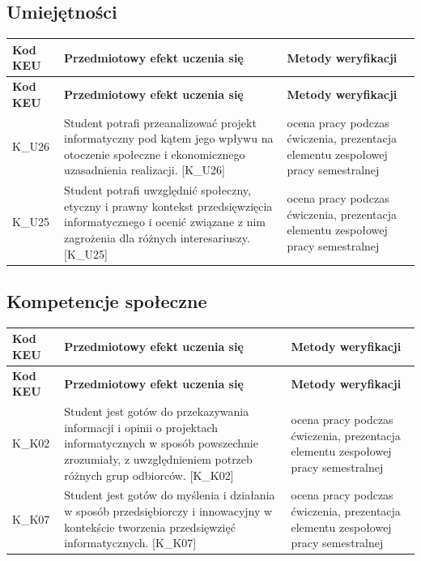 \documentclass[12pt, a4paper]{article}
\newcommand{\thdrule}{\noalign{\global\setlength{\extrarowheight}{0pt}}}
\newcommand{\thdend}{\noalign{\global\setlength{\extrarowheight}{3pt}}}
\begin{document}
\subsection*{Umiejętności}
{\scriptsize
\begin{longtable}{m{1.6cm}m{9.0cm}m{4.2cm}}
\thdrule\toprule
\rowcolor{pjatkRed} {\color{white}\footnotesize\textbf{\vphantom{Ag}Kod KEU}} & {\color{white}\footnotesize\textbf{\vphantom{Ag}Przedmiotowy efekt uczenia się}} & {\color{white}\footnotesize\textbf{\vphantom{Ag}Metody weryfikacji}} \\
\midrule\thdend
\endfirsthead
\thdrule\toprule
\rowcolor{pjatkRed} {\color{white}\footnotesize\textbf{\vphantom{Ag}Kod KEU}} & {\color{white}\footnotesize\textbf{\vphantom{Ag}Przedmiotowy efekt uczenia się}} & {\color{white}\footnotesize\textbf{\vphantom{Ag}Metody weryfikacji}} \\
\midrule\thdend
\endhead
  \rowcolor{tableRowLight} K\_U26 & Student potrafi przeanalizować projekt informatyczny pod kątem jego wpływu na otoczenie społeczne i ekonomicznego uzasadnienia realizacji. {[}K\_U26{]} & ocena pracy podczas ćwiczenia, prezentacja elementu zespołowej pracy semestralnej \\
  \rowcolor{tableRowAlt} K\_U25 & Student potrafi uwzględnić społeczny, etyczny i prawny kontekst przedsięwzięcia informatycznego i ocenić związane z nim zagrożenia dla różnych interesariuszy. {[}K\_U25{]} & ocena pracy podczas ćwiczenia, prezentacja elementu zespołowej pracy semestralnej \\
\bottomrule
\end{longtable}}

\subsection*{Kompetencje społeczne}
{\scriptsize
\begin{longtable}{m{1.6cm}m{9.0cm}m{4.2cm}}
\thdrule\toprule
\rowcolor{pjatkRed} {\color{white}\footnotesize\textbf{\vphantom{Ag}Kod KEU}} & {\color{white}\footnotesize\textbf{\vphantom{Ag}Przedmiotowy efekt uczenia się}} & {\color{white}\footnotesize\textbf{\vphantom{Ag}Metody weryfikacji}} \\
\midrule\thdend
\endfirsthead
\thdrule\toprule
\rowcolor{pjatkRed} {\color{white}\footnotesize\textbf{\vphantom{Ag}Kod KEU}} & {\color{white}\footnotesize\textbf{\vphantom{Ag}Przedmiotowy efekt uczenia się}} & {\color{white}\footnotesize\textbf{\vphantom{Ag}Metody weryfikacji}} \\
\midrule\thdend
\endhead
  \rowcolor{tableRowLight} K\_K02 & Student jest gotów do przekazywania informacji i opinii o projektach informatycznych w sposób powszechnie zrozumiały, z uwzględnieniem potrzeb różnych grup odbiorców. {[}K\_K02{]} & ocena pracy podczas ćwiczenia, prezentacja elementu zespołowej pracy semestralnej \\
  \rowcolor{tableRowAlt} K\_K07 & Student jest gotów do myślenia i działania w sposób przedsiębiorczy i innowacyjny w kontekście tworzenia przedsięwzięć informatycznych. {[}K\_K07{]} & ocena pracy podczas ćwiczenia, prezentacja elementu zespołowej pracy semestralnej \\
\bottomrule
\end{longtable}}
\end{document}
